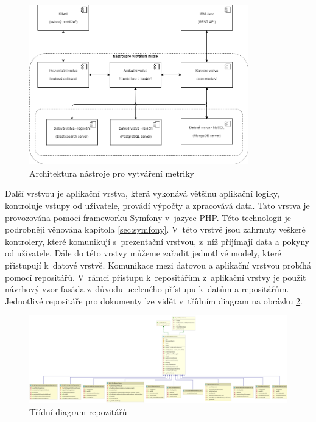 \documentclass[czech,master]{diploma}
\begin{document}
\begin{figure}[!ht]
    \centering
    \includegraphics[width=0.85\textwidth]{Diplomka/Figures/architektura.png}
    \caption{Architektura nástroje pro vytváření metriky}
    \label{fig:architektura_nastroje}
\end{figure}

Další vrstvou je aplikační vrstva, která vykonává většinu aplikační logiky, kontroluje vstupy od uživatele, provádí výpočty a zpracovává data. Tato vrstva je provozována pomocí frameworku Symfony v~jazyce PHP. Této technologii je podrobněji věnována kapitola \ref{sec:symfony}. V~této vrstvě jsou zahrnuty veškeré kontrolery, které komunikují s~prezentační vrstvou, z~níž přijímají data a pokyny od uživatele. Dále do této vrstvy můžeme zařadit jednotlivé modely, které přistupují k~datové vrstvě. Komunikace mezi datovou a aplikační vrstvou probíhá pomocí repositářů. V~rámci přístupu k~repositářům z~aplikační vrstvy je použit návrhový vzor fasáda z~důvodu uceleného přístupu k~datům a repositářům. Jednotlivé repositáře pro dokumenty lze vidět v~třídním diagram na obrázku \ref{fig:class_diagram_repository}.

\begin{figure}[!ht]
    \centering
    \includegraphics[width=1\textwidth]{Diplomka/Figures/class_diagram_repository.png}
    \caption{Třídní diagram repozitářů}
    \label{fig:class_diagram_repository}
\end{figure}
\end{document}
